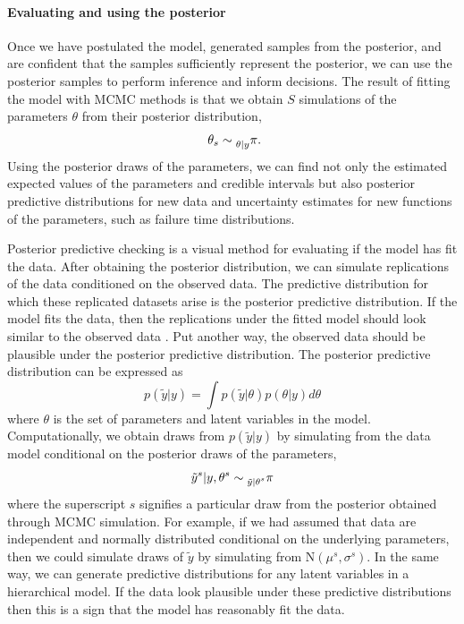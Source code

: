 \paragraph*{Evaluating and using the posterior}

Once we have postulated the model, generated samples from the posterior, and are confident that the samples sufficiently represent the posterior, we can use the posterior samples to perform inference and inform decisions. The result of fitting the model with MCMC methods is that we obtain $S$ simulations of the parameters $\theta$ from their posterior distribution,
\begin{equation}
  \theta_s \sim \prescript{}{\theta|y}{\pi}.
\end{equation}
Using the posterior draws of the parameters, we can find not only the estimated expected values of the parameters and credible intervals but also posterior predictive distributions for new data and uncertainty estimates for new functions of the parameters, such as failure time distributions.

Posterior predictive checking \citep{BDA2020} is a visual method for evaluating if the model has fit the data. After obtaining the posterior distribution, we can simulate replications of the data conditioned on the observed data. The predictive distribution for which these replicated datasets arise is the posterior predictive distribution. If the model fits the data, then the replications under the fitted model should look similar to the observed data \citep[p.~143]{BDA2020}. Put another way, the observed data should be plausible under the posterior predictive distribution. The posterior predictive distribution can be expressed as
\begin{equation}
 p(\tilde{y}|y) = \int p(\tilde{y}|\theta)p(\theta|y)d\theta
\end{equation}
where $\theta$ is the set of parameters and latent variables in the model. Computationally, we obtain draws from $p(\tilde{y}|y)$ by simulating from the data model conditional on the posterior draws of the parameters,
\begin{equation}
 \tilde{y}^s|y, \theta^s \sim \prescript{}{\tilde{y}|\theta^s}{\pi}
\end{equation}
where the superscript $s$ signifies a particular draw from the posterior obtained through MCMC simulation. For example, if we had assumed that data are independent and normally distributed conditional on the underlying parameters, then we could simulate draws of $\tilde{y}$ by simulating from $\mbox{N}(\mu^s, \sigma^s)$. In the same way, we can generate predictive distributions for any latent variables in a hierarchical model. If the data look plausible under these predictive distributions then this is a sign that the model has reasonably fit the data.

